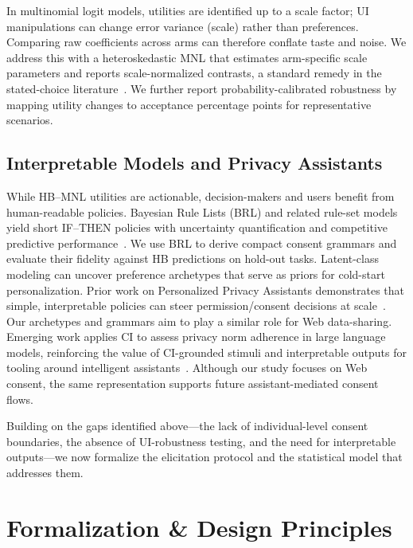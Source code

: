 \documentclass{eusset}
\begin{document}
In multinomial logit models, utilities are identified up to a scale factor; UI manipulations can change error variance (scale) rather than preferences. Comparing raw coefficients across arms can therefore conflate taste and noise. We address this with a heteroskedastic MNL that estimates arm-specific scale parameters and reports scale-normalized contrasts, a standard remedy in the stated-choice literature~\citep{Swait1993SL,Fiebig2010GMNL,Train2009DCMS}. We further report probability-calibrated robustness by mapping utility changes to acceptance percentage points for representative scenarios.

\subsection{Interpretable Models and Privacy Assistants}
\label{subsec:interpretable}
While HB--MNL utilities are actionable, decision-makers and users benefit from human-readable policies. Bayesian Rule Lists (BRL) and related rule-set models yield short IF--THEN policies with uncertainty quantification and competitive predictive performance~\citep{Letham2015BRL,Wang2017BRS}. We use BRL to derive compact consent grammars and evaluate their fidelity against HB predictions on hold-out tasks. Latent-class modeling can uncover preference archetypes that serve as priors for cold-start personalization. Prior work on Personalized Privacy Assistants demonstrates that simple, interpretable policies can steer permission/consent decisions at scale~\citep{Liu2016PPA}. Our archetypes and grammars aim to play a similar role for Web data-sharing. Emerging work applies CI to assess privacy norm adherence in large language models, reinforcing the value of CI-grounded stimuli and interpretable outputs for tooling around intelligent assistants~\citep{mireshghallah2023can,shvartzshnaider2024investigating}. Although our study focuses on Web consent, the same representation supports future assistant-mediated consent flows.

Building on the gaps identified above---the lack of individual-level consent boundaries, the absence of UI-robustness testing, and the need for interpretable outputs---we now formalize the elicitation protocol and the statistical model that addresses them.

\section{Formalization \& Design Principles}
\label{sec:formalization}
\end{document}

